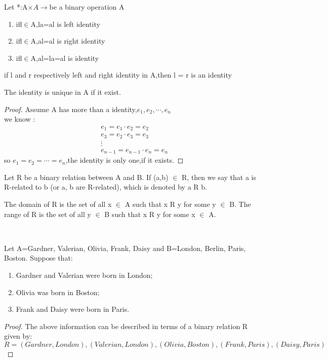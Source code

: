 \documentclass[cn,10pt,math=newtx,citestyle=gb7714-2015,bibstyle=gb7714-2015]{elegantbook}
\begin{document}
\begin{definition}[identity]
Let *:A$\times A \to $be a binary operation A
\begin{enumerate}
	\item if\quad l$\in$A,la=a\quad l is left identity
	\item if\quad l$\in$A,al=a\quad l is right identity
	\item if\quad l$\in$A,al=la=a\quad l is identity
\end{enumerate}	
\end{definition}

\begin{theorem}
	if  l and r respectively left and right identity in A,then l = r is an identity
\end{theorem}
	
\begin{theorem}
	The identity is unique in A if it exist.
\end{theorem}
\begin{proof}
	Assume A has more than a identity,$e_1,e_2,\cdots,e_n$\\
	we know :
\begin{align*}
	&e_1=e_1\cdot e_2=e_2\\	
	&e_3=e_2\cdot e_3=e_3\\
	&\vdots\\
	&e_{n-1}=e_{n-1}\cdot e_n=e_n
\end{align*}
so $e_1=e_2=\cdots=e_n$,the identity is only one,if it exists.
\end{proof}
\begin{definition}
    Let R be a binary relation between A and B. If (a,b) $\in$ R, then we say that a is R-related to b (or a, b are R-related), which is denoted by a R b. 
\end{definition}
\begin{remark}
    The domain of R is the set of all x $\in$ A such that x R y for some
y $\in$ B. The range of R is the set of all y $\in$ B such that x R y for some x $\in$ A.
\end{remark}

\\
\begin{example}
    Let A={Gardner, Valerian, Olivia, Frank, Daisy} and
B={London, Berlin, Paris, Boston}. Suppose that: 
\begin{enumerate}
    \item Gardner and Valerian were born in London;
    \item Olivia was born in Boston;
    \item Frank and Daisy were born in Paris.
\end{enumerate}
\end{example}
\begin{proof}
    The above information can be described in terms of a binary relation R given by:
\begin{equation*}
    R={(Gardner, London), (Valerian, London),
(Olivia, Boston), (Frank, Paris), (Daisy, Paris)}
\end{equation*}
\end{proof}
\end{document}

